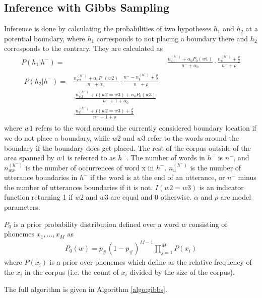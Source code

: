\documentclass[11pt]{article}
\begin{document}
\subsection{Inference with Gibbs Sampling}
\FloatBarrier
Inference is done by calculating the probabilities of two hypotheses $h_1$ and
$h_2$ at a potential boundary, where $h_1$ corresponds to not placing a
boundary there and $h_2$ corresponds to the contrary.
They are calculated as
\begin{align}
  P(h_1 | h^-) =& \frac{n_{w1}^{(h^-)} + \alpha_0 P_0(w1)}{n^- + \alpha_0} \cdot
                 \frac{n_u^{(h^-)} + \frac{\rho}{2}}{n^- + \rho}
                  \label{eq:h1} \\
  \begin{split}
  P(h_2 | h^-) =& \frac{n_{w2}^{(h^-)} + \alpha_0 P_0(w2)}{n^- + \alpha_0}
                  \cdot \frac{n^- - n_\$^{(h^-)} + \frac{\rho}{2}}{n^- + \rho} \\
                & \cdot \frac{n_{w3}^{(h^-)} + I(w2 = w3) + \alpha_0 P_0(w3)}{n^-
                  + 1 + \alpha_0} \\
                & \cdot \frac{n_u^{(h^-)} + I(w2 = w3) + \frac{\rho}{2}}{n^- + 1 + \rho}
                \label{eq:h2}
  \end{split}
\end{align}
where $w1$ refers to the word around the currently considered boundary location
if we do not place a boundary, while $w2$ and $w3$ refer to the words around the
boundary if the boundary does get placed. The rest of the corpus outside of the
area spanned by $w1$ is referred to as $h^-$. The number of words in $h^-$ is
$n^-$, and $n_{wx}^{(h^-)}$ is the number of occurrences of word x in $h^-$.
$n_u^{(h^-)}$ is the number of utterance boundaries in $h^-$ if the word is at
the end of an utterance, or $n^-$ minus the number of utterances boundaries if
it is not. $I(w2 = w3)$ is an indicator function returning 1 if $w2$ and $w3$
are equal and 0 otherwise. $\alpha$ and $\rho$ are model parameters.

$P_0$ is a prior probability distribution defined over a word $w$ consisting of
phonemes $x_1, \dots, x_M$ as
\begin{align}
  P_0(w) = p_\# (1 - p_\#)^{M-1} \prod_{j=1}^M P(x_i)
\end{align}
where $P(x_i)$ is a prior over phonemes which define as the relative frequency
of the $x_i$ in the corpus (i.e. the count of $x_i$ divided by the size of the corpus).

The full algorithm is given in Algorithm \ref{algo:gibbs}.
\end{document}
